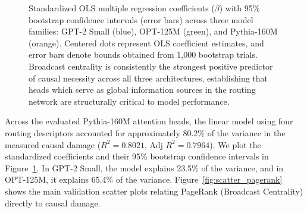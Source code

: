 \documentclass[11pt,a4paper]{article}
\theoremstyle{definition}
\theoremstyle{plain}
\begin{document}
\begin{figure}[t]
\caption{Standardized OLS multiple regression coefficients ($\beta$) with 95\% bootstrap confidence intervals (error bars) across three model families: GPT-2 Small (blue), OPT-125M (green), and Pythia-160M (orange). Centered dots represent OLS coefficient estimates, and error bars denote bounds obtained from 1,000 bootstrap trials. Broadcast centrality is consistently the strongest positive predictor of causal necessity across all three architectures, establishing that heads which serve as global information sources in the routing network are structurally critical to model performance.}
\label{fig:coefficients}
\end{figure}

Across the evaluated Pythia-160M attention heads, the linear model using four routing descriptors accounted for approximately 80.2\% of the variance in the measured causal damage ($R^2 = 0.8021$, Adj $R^2 = 0.7964$). We plot the standardized coefficients and their 95\% bootstrap confidence intervals in Figure~\ref{fig:coefficients}. In GPT-2 Small, the model explains 23.5\% of the variance, and in OPT-125M, it explains 65.4\% of the variance. Figure~\ref{fig:scatter_pagerank} shows the main validation scatter plots relating PageRank (Broadcast Centrality) directly to causal damage.
\end{document}
